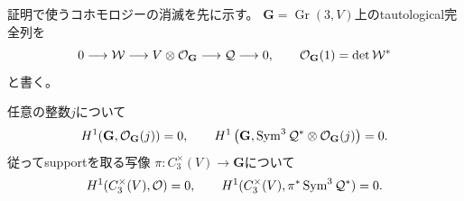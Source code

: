 証明で使うコホモロジーの消滅を先に示す。
$\mathbf G=\operatorname{Gr}(3,V)$上のtautological完全列を
\begin{equation}
 0\longrightarrow\mathcal W\longrightarrow V\otimes\mathcal O_{\mathbf G}
 \longrightarrow\mathcal Q\longrightarrow0,\qquad
 \mathcal O_{\mathbf G}(1)=\det\mathcal W^*
 \label{eq:pg-rank-two-tautological-sequence}
\end{equation}
と書く。

\begin{lemma}[中心三次束の一次コホモロジー]
\label{lem:pg-rank-two-bott-vanishing}
任意の整数$j$について
\begin{equation}
 H^1(\mathbf G,\mathcal O_{\mathbf G}(j))=0,\qquad
 H^1\left(\mathbf G,
 \operatorname{Sym}^3\mathcal Q^*\otimes\mathcal O_{\mathbf G}(j)\right)=0.
 \label{eq:pg-rank-two-bott-vanishing}
\end{equation}
従ってsupportを取る写像
$\pi:C_3^\times(V)\to\mathbf G$について
\begin{equation}
 H^1(C_3^\times(V),\mathcal O)=0,\qquad
 H^1(C_3^\times(V),\pi^*\operatorname{Sym}^3\mathcal Q^*)=0.
 \label{eq:pg-rank-two-cone-cohomology}
\end{equation}
\end{lemma}
